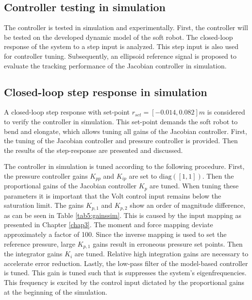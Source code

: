 \subsection{Controller testing in simulation}

The controller is tested in simulation and experimentally. First, the controller will be tested on the developed dynamic model of the soft robot. The closed-loop response of the system to a step input is analyzed. This step input is also used for controller tuning. Subsequently, an ellipsoid reference signal is proposed to evaluate the tracking performance of the Jacobian controller in simulation. 


\subsection*{Closed-loop step response in simulation}

A closed-loop step response with set-point $r_{set} = [-0.014,0.082]m$ is considered to verify the controller in simulation. This set-point demands the soft robot to bend and elongate, which allows tuning all gains of the Jacobian controller. First, the tuning of the Jacobian controller and pressure controller is provided. Then the results of the step-response are presented and discussed. 

The controller in simulation is tuned according to the following procedure. First, the pressure controller gains $K_{pp}$ and $K_{ip}$ are set to $\text{diag}([1,1])$. Then the proportional gains of the Jacobian controller $K_p$ are tuned. When tuning these parameters it is important that the Volt control input remains below the saturation limit. The gains $K_{p,1}$ and $K_{p,2}$ show an order of magnitude difference, as can be seen in Table \ref{tab5:gainssim}. This is caused by the input mapping as presented in Chapter \ref{chap3}. The moment and force mapping deviate approximately a factor of 100. Since the inverse mapping is used to set the reference pressure, large $K_{p,1}$ gains result in erroneous pressure set points. Then the integrator gains $K_i$ are tuned. Relative high integration gains are necessary to accelerate error reduction. Lastly, the low-pass filter of the model-based controller is tuned. This gain is tuned such that is suppresses the system's eigenfrequencies. This frequency is excited by the control input dictated by the proportional gains at the beginning of the simulation. 



